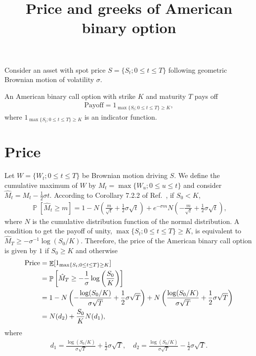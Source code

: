 \documentclass{article}
\def\Pr{\mathop{\mathbb{P}}}
\newcommand\Ex{\mathop{\mathbb{E}}}
\newcommand\br[1]{\left(#1\right)}
\newcommand\bbr[1]{\left[#1\right]}
\begin{document}
\title{Price and greeks of American binary option}
\date{}

\maketitle


Consider an asset with spot price $S = \{S_t; 0 \leq t \leq T\}$ following geometric Brownian motion of volatility $\sigma$.

An American binary call option with strike $K$ and maturity $T$ pays off
\begin{align}
    \text{Payoff}
        = 1_{\max\{S_t; 0 \leq t \leq T\} \geq K} ,
\end{align}
where
$1_{\max\{S_t; 0 \leq t \leq T\} \geq K}$ is an indicator function.


\section*{Price}


Let $W = \{W_t; 0 \leq t \leq T\}$ be Brownian motion driving $S$.
We define the cumulative maximum of $W$ by $M_t = \max\{W_u; 0 \leq u \leq t\}$ and
consider $\hat M_t = M_t - \frac12 \sigma t$.
According to Corollary 7.2.2 of Ref.~\cite{shreve}, if $S_0 < K$,
\begin{align}
    \Pr[\hat M_t \geq m]
        = 1 - N\br{\frac{m}{\sqrt{t}} + \frac12 \sigma \sqrt{t}}
            + e^{-\sigma m} N\br{-\frac{m}{\sqrt{t}} + \frac12 \sigma \sqrt{t}} ,
\end{align}
where
$N$ is the cumulative distribution function of the normal distribution.
A condition to get the payoff of unity, $\max\{S_t; 0 \leq t \leq T\} \geq K$, is equivalent to $\hat M_T \geq - \sigma^{-1} \log(S_0 / K)$.
Therefore, the price of the American binary call option is given by
$1$ if $S_0 \geq K$ and otherwise
\begin{align}
    \text{Price}
        & = \Ex[1_{\max\{S_t; 0 \leq t \leq T\} \geq K}] \notag \\
        & = \Pr\bbr{\hat M_T \geq - \frac{1}{\sigma}\log\br{\frac{S_0}{K}}} \notag \\
        & = 1 - N\br{- \frac{\log(S_0 / K)}{\sigma \sqrt{T}} + \frac12 \sigma \sqrt{T}}
            + N\br{\frac{\log(S_0 / K)}{\sigma \sqrt{T}} + \frac12 \sigma \sqrt{T}}
            \notag \\
        & = N(d_2) + \frac{S_0}{K} N(d_1) ,
\end{align}
where
\begin{align}
    d_1
        = \frac{\log (S_0 / K)}{\sigma \sqrt{T}} + \frac12 \sigma \sqrt{T} ,
    \quad
    d_2
        = \frac{\log (S_0 / K)}{\sigma \sqrt{T}} - \frac12 \sigma \sqrt{T} .
\end{align}
\end{document}

